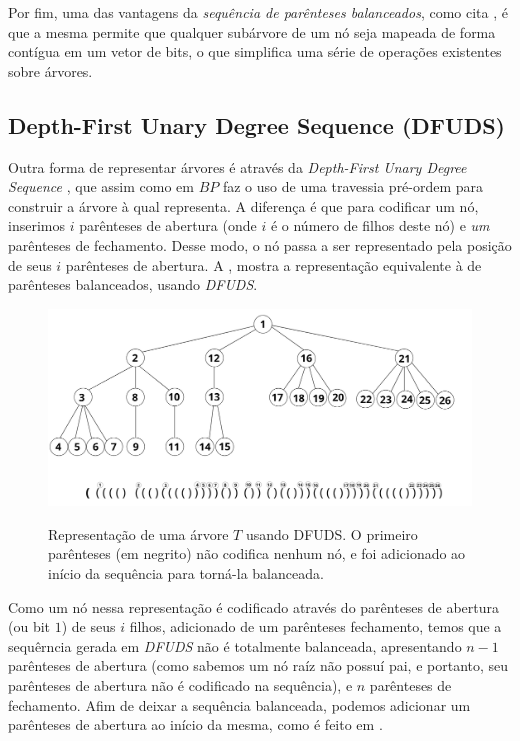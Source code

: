 Por fim, uma das vantagens da \textit{sequência de parênteses balanceados}, como cita \cite{book-compact-data-structures}, é que a mesma permite que qualquer subárvore de um nó seja mapeada de forma contígua em um vetor de bits, o que simplifica uma série de operações existentes sobre árvores.

\subsection{Depth-First Unary Degree Sequence (DFUDS)}
Outra forma de representar árvores é através da \textit{Depth-First Unary Degree Sequence} \citep{article-dfuds}, que assim como em $BP$ faz o uso de uma travessia pré-ordem para construir a árvore à qual representa.
A diferença é que  para codificar um nó, inserimos $i$ parênteses de abertura (onde $i$ é o número de filhos deste nó) e \textit{um} parênteses de fechamento.  Desse modo, o nó passa a ser representado pela posição de seus $i$ parênteses de abertura. A , mostra a representação equivalente à de parênteses balanceados, usando \textit{DFUDS}.
\begin{figure}[!ht]
    \centering
      \caption[Representação de árvores com Sequência de Grau Unário]{Representação de uma árvore $T$ usando DFUDS. O primeiro parênteses (em negrito) não codifica nenhum nó, e foi adicionado ao início da sequência  para torná-la balanceada.}
      \includegraphics[width=\columnwidth]{images/dfuds.png}
      \label{fig:dfuds-representation}
\end{figure}

Como um nó nessa representação é codificado através do parênteses de abertura (ou bit $1$) de seus $i$ filhos, adicionado de um parênteses fechamento, temos que a sequêrncia gerada em \textit{DFUDS} não é totalmente balanceada, apresentando $n-1$ parênteses de abertura (como sabemos um nó raíz não possuí pai, e portanto, seu parênteses de abertura não é codificado na sequência), e $n$ parênteses de fechamento.  Afim de deixar a sequência balanceada, podemos adicionar um parênteses de abertura ao início da mesma, como é feito em \citet{paper-succint-trees-in-practice}.

